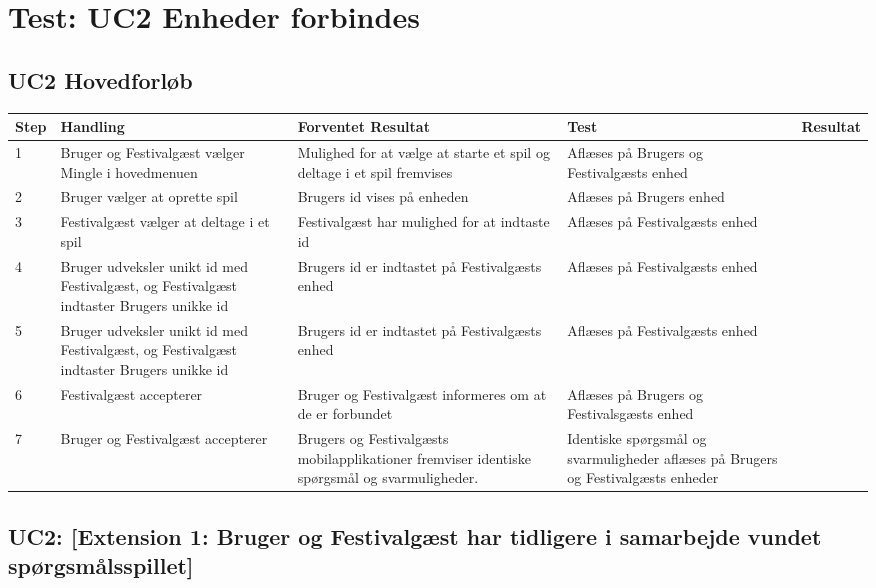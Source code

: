\newpage
\section{Test: UC2 Enheder forbindes}



\subsection{UC2 Hovedforløb}

\begin{longtable}{| p{0.7cm}  | p{3cm}  | p{4cm} |  p{3cm}  | p{3cm}  |}
\hline
Step & Handling & Forventet Resultat & Test & Resultat \\
\hline
1 &  Bruger og Festivalgæst vælger Mingle i hovedmenuen &  Mulighed for at vælge at starte et spil og deltage i et spil fremvises  & Aflæses på Brugers og Festivalgæsts enhed & \FuckingHuge{\checkmark} \\
\hline
2 &  Bruger vælger at oprette spil &  Brugers id vises på enheden  & Aflæses på Brugers enhed & \FuckingHuge{\checkmark} \\
\hline
3 &  Festivalgæst vælger at deltage i et spil &  Festivalgæst har mulighed for at indtaste id  & Aflæses på Festivalgæsts enhed & \FuckingHuge{\checkmark} \\
\hline
4 &  Bruger udveksler unikt id med Festivalgæst, og Festivalgæst indtaster Brugers unikke id &  Brugers id er indtastet på Festivalgæsts enhed  & Aflæses på Festivalgæsts enhed & \FuckingHuge{\checkmark} \\
\hline
5 &  Bruger udveksler unikt id med Festivalgæst, og Festivalgæst indtaster Brugers unikke id &  Brugers id er indtastet på Festivalgæsts enhed  & Aflæses på Festivalgæsts enhed & \FuckingHuge{\checkmark} \\
\hline
6 & Festivalgæst accepterer &  Bruger og Festivalgæst informeres om at de er forbundet & Aflæses på Brugers og Festivalsgæsts enhed & \FuckingHuge{\checkmark}\\ 
\hline
7 & Bruger og Festivalgæst accepterer &   Brugers og Festivalgæsts mobilapplikationer fremviser identiske spørgsmål og svarmuligheder. & Identiske spørgsmål og svarmuligheder aflæses på Brugers og Festivalgæsts enheder & \FuckingHuge{\checkmark} \\
\hline
\end{longtable}

\newpage

\subsection{UC2: [Extension 1: Bruger og Festivalgæst har tidligere i samarbejde vundet spørgsmålsspillet]}

